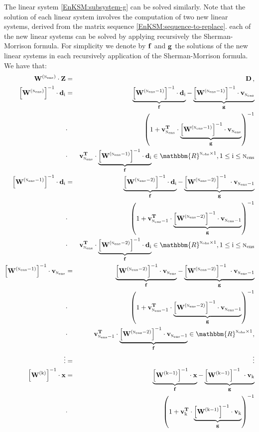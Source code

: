 \documentclass[12pt]{article}
\newcommand{\inv}[1]{\left[{\bf W^{(\rm #1)}}\right]^{\rm -1}}
\newcommand{\Nobs}{\textsc{n}_{{\rm obs}}}
\newcommand{\Nens}{\textsc{n}_{{\rm ens}}}
\newcommand{\Z}{{\bf Z}}
\newcommand{\D}{{\bf D}}
\renewcommand{\d}[1]{{\bf d}_{\rm #1}}
\newcommand{\W}[1]{{{\bf W}^{\left ( {\rm #1} \right )}}}
\renewcommand{\v}[1]{{\bf v}_{{\rm #1}}}
\renewcommand{\Re}{\mathbbm{R}}
\newcommand{\invM}[1]{\left( #1 \right )^{-1}}
\newcommand{\x}{{\bf x}}
\renewcommand{\k}{{\rm k}}
\begin{document}
The linear system \eqref{EnKSM:subsystem-g} can be solved similarly. Note that the solution of each linear system involves the computation of two new linear systems, derived from the matrix sequence  \eqref{EnKSM:sequence-to-replace}. each of the new linear systems can be solved by applying recursively the Sherman-Morrison formula. For simplicity we denote by ${\bf f}$ and ${\bf g}$ the solutions of the new linear systems in each recursively application of the Sherman-Morrison formula. We have that:
{\allowdisplaybreaks
\begin{eqnarray}
\label{EnKSM:recursive-solution} \nonumber
\displaystyle \W{\Nens} \cdot \Z &=& \D \,, \\ \nonumber
\inv{\Nens} \cdot \d{i} &=& \underbrace{\inv{\Nens-1} \cdot \d{i}}_{\bf f}-\underbrace{\inv{\Nens-1} \cdot \v{\Nens}}_{\bf g} \\ \nonumber
&\cdot & \invM{1+\v{\Nens}^{\bf T} \cdot \underbrace{\inv{\Nens-1} \cdot \v{\Nens}}_{\bf g}} \\ \nonumber
&\cdot &\v{\Nens}^{\bf T} \cdot \underbrace{\inv{\Nens-1} \cdot \d{i}}_{\bf f} \in \Re^{\Nobs \times 1}, 1 \le {\rm i} \le \Nens \\ \nonumber
\inv{\Nens-1} \cdot \d{i} &=& \underbrace{\inv{\Nens-2} \cdot \d{i}}_{\bf f}-\underbrace{\inv{\Nens-2}\ \cdot \v{\Nens-1}}_{\bf g} \\ \nonumber
&\cdot & \invM{1+\v{\Nens-1}^{\bf T} \cdot \underbrace{\inv{\Nens-2} \cdot \v{\Nens-1}}_{\bf g}} \\ \nonumber
&\cdot & \v{\Nens}^{\bf T} \cdot \underbrace{\inv{\Nens-2} \cdot \d{i}}_{\bf f} \in \Re^{\Nobs \times 1}, 1 \le {\rm i} \le \Nens \\ \nonumber
\inv{\Nens-1} \cdot \v{\Nens} &=& \underbrace{\inv{\Nens-2} \cdot \v{\Nens}}_{\bf f}-\underbrace{\inv{\Nens-2}\ \cdot \v{\Nens-1}}_{\bf g} \\ \nonumber
&\cdot & \invM{1+\v{\Nens-1}^{\bf T} \cdot \underbrace{\inv{\Nens-2} \cdot \v{\Nens-1}}_{\bf g}} \\ \nonumber
&\cdot & \v{\Nens-1}^{\bf T} \cdot \underbrace{\inv{\Nens-2} \cdot \v{\Nens-1}}_{\bf f} \in \Re^{\Nobs \times 1}, \\ \nonumber
\vdots & =& \vdots \\ \nonumber
\inv{k} \cdot \x &=& \underbrace{\inv{k-1} \cdot \x}_{\bf f}-\underbrace{\inv{k-1}\ \cdot \v{k}}_{\bf g} \\ \nonumber
&\cdot & \invM{1+\v{k}^{\bf T} \cdot \underbrace{\inv{\k-1} \cdot \v{k}}_{\bf g}} \\ \nonumber

\end{eqnarray}}
\end{document}

